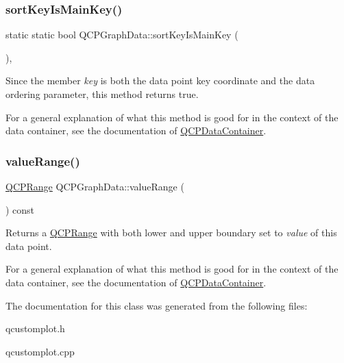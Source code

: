 \subsubsection{\texorpdfstring{sort\+Key\+Is\+Main\+Key()}{sortKeyIsMainKey()}}
{\footnotesize\ttfamily static static bool Q\+C\+P\+Graph\+Data\+::sort\+Key\+Is\+Main\+Key (\begin{DoxyParamCaption}{ }\end{DoxyParamCaption})\hspace{0.3cm}{\ttfamily [inline]}, {\ttfamily [static]}}

Since the member {\itshape key} is both the data point key coordinate and the data ordering parameter, this method returns true.

For a general explanation of what this method is good for in the context of the data container, see the documentation of \hyperlink{classQCPDataContainer}{Q\+C\+P\+Data\+Container}. \mbox{\label{classQCPGraphData_a2f8dd30360356f66cc418a170a9f3792}} 
\subsubsection{\texorpdfstring{value\+Range()}{valueRange()}}
{\footnotesize\ttfamily \hyperlink{classQCPRange}{Q\+C\+P\+Range} Q\+C\+P\+Graph\+Data\+::value\+Range (\begin{DoxyParamCaption}{ }\end{DoxyParamCaption}) const\hspace{0.3cm}{\ttfamily [inline]}}

Returns a \hyperlink{classQCPRange}{Q\+C\+P\+Range} with both lower and upper boundary set to {\itshape value} of this data point.

For a general explanation of what this method is good for in the context of the data container, see the documentation of \hyperlink{classQCPDataContainer}{Q\+C\+P\+Data\+Container}. 

The documentation for this class was generated from the following files\+:\begin{DoxyCompactItemize}
\item 
qcustomplot.\+h\item 
qcustomplot.\+cpp\end{DoxyCompactItemize}
